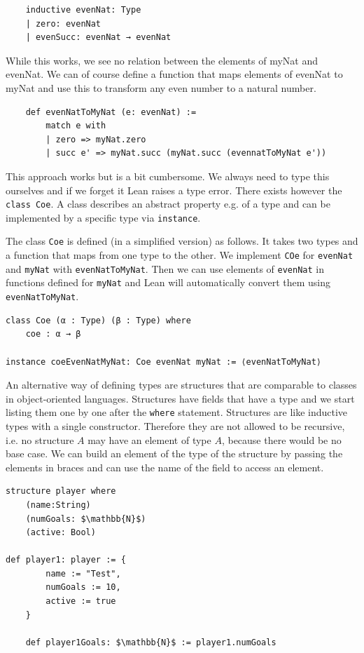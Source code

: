 \begin{lstlisting}
    inductive evenNat: Type
    | zero: evenNat
    | evenSucc: evenNat → evenNat
\end{lstlisting}

While this works, we see no relation between the elements of myNat and evenNat. We can of course define a function that maps elements of evenNat to myNat and use this to transform any even number to a natural number.

\begin{lstlisting}
    def evenNatToMyNat (e: evenNat) := 
        match e with
        | zero => myNat.zero
        | succ e' => myNat.succ (myNat.succ (evennatToMyNat e'))
\end{lstlisting}

This approach works but is a bit cumbersome. We always need to type this ourselves and if we forget it Lean raises a type error. There exists however the \lstinline|class Coe|. A class describes an abstract property e.g. of a type and can be implemented by a specific type via \lstinline|instance|.

The class \lstinline|Coe| is defined (in a simplified version) as follows. It takes two types and a function that maps from one type to the other. We implement \lstinline|COe| for \lstinline|evenNat| and \lstinline|myNat| with \lstinline|evenNatToMyNat|. Then we can use elements of \lstinline|evenNat| in functions defined for \lstinline|myNat| and Lean will automatically convert them using \lstinline|evenNatToMyNat|.

\begin{lstlisting}
class Coe (α : Type) (β : Type) where
    coe : α → β

instance coeEvenNatMyNat: Coe evenNat myNat := ⟨evenNatToMyNat⟩
\end{lstlisting}

An alternative way of defining types are structures that are comparable to classes in object-oriented languages. Structures have fields that have a type and we start listing them one by one after the \lstinline|where| statement. Structures are like inductive types with a single constructor. Therefore they are not allowed to be recursive, i.e. no structure $A$ may have an element of type $A$, because there would be no base case.
We can build an element of the type of the structure by passing the elements in braces and can use the name of the field to access an element.

\begin{lstlisting}
structure player where
    (name:String)
    (numGoals: $\mathbb{N}$)
    (active: Bool)

def player1: player := {
        name := "Test",
        numGoals := 10,
        active := true
    }

    def player1Goals: $\mathbb{N}$ := player1.numGoals
\end{lstlisting}

